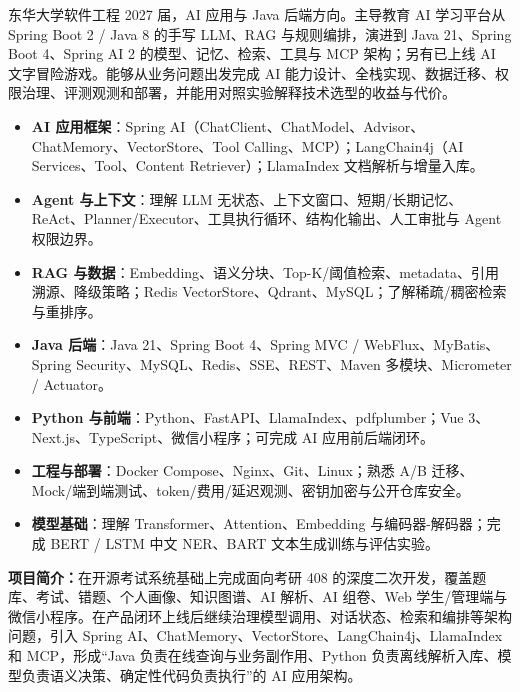 东华大学软件工程 2027 届，AI 应用与 Java 后端方向。主导教育 AI 学习平台从 Spring Boot 2 / Java 8 的手写 LLM、RAG 与规则编排，演进到 Java 21、Spring Boot 4、Spring AI 2 的模型、记忆、检索、工具与 MCP 架构；另有已上线 AI 文字冒险游戏。能够从业务问题出发完成 AI 能力设计、全栈实现、数据迁移、权限治理、评测观测和部署，并能用对照实验解释技术选型的收益与代价。

\begin{itemize}[parsep=0.5ex]
  \item \textbf{AI 应用框架}：Spring AI（ChatClient、ChatModel、Advisor、ChatMemory、VectorStore、Tool Calling、MCP）；LangChain4j（AI Services、Tool、Content Retriever）；LlamaIndex 文档解析与增量入库。
  \item \textbf{Agent 与上下文}：理解 LLM 无状态、上下文窗口、短期/长期记忆、ReAct、Planner/Executor、工具执行循环、结构化输出、人工审批与 Agent 权限边界。
  \item \textbf{RAG 与数据}：Embedding、语义分块、Top-K/阈值检索、metadata、引用溯源、降级策略；Redis VectorStore、Qdrant、MySQL；了解稀疏/稠密检索与重排序。
  \item \textbf{Java 后端}：Java 21、Spring Boot 4、Spring MVC / WebFlux、MyBatis、Spring Security、MySQL、Redis、SSE、REST、Maven 多模块、Micrometer / Actuator。
  \item \textbf{Python 与前端}：Python、FastAPI、LlamaIndex、pdfplumber；Vue 3、Next.js、TypeScript、微信小程序；可完成 AI 应用前后端闭环。
  \item \textbf{工程与部署}：Docker Compose、Nginx、Git、Linux；熟悉 A/B 迁移、Mock/端到端测试、token/费用/延迟观测、密钥加密与公开仓库安全。
  \item \textbf{模型基础}：理解 Transformer、Attention、Embedding 与编码器-解码器；完成 BERT / LSTM 中文 NER、BART 文本生成训练与评估实验。
\end{itemize}



\textbf{项目简介：}在开源考试系统基础上完成面向考研 408 的深度二次开发，覆盖题库、考试、错题、个人画像、知识图谱、AI 解析、AI 组卷、Web 学生/管理端与微信小程序。在产品闭环上线后继续治理模型调用、对话状态、检索和编排等架构问题，引入 Spring AI、ChatMemory、VectorStore、LangChain4j、LlamaIndex 和 MCP，形成“Java 负责在线查询与业务副作用、Python 负责离线解析入库、模型负责语义决策、确定性代码负责执行”的 AI 应用架构。

